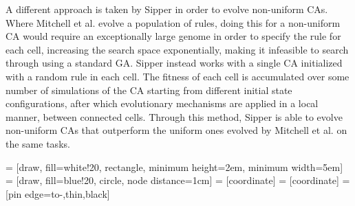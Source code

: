 A different approach is taken by Sipper \cite{Sipper2004} in order to evolve
non-uniform CAs. Where Mitchell et al. evolve a population of rules, doing this
for a non-uniform CA would require an exceptionally large genome in order to
specify the rule for each cell, increasing the search space exponentially,
making it infeasible to search through using a standard GA. Sipper instead
works with a single CA initialized with a random rule in each cell. The fitness
of each cell is accumulated over some number of simulations of the CA starting
from different initial state configurations, after which evolutionary mechanisms
are applied in a local manner, between connected cells. Through this method,
Sipper is able to evolve non-uniform CAs that outperform the uniform ones
evolved by Mitchell et al. on the same tasks.


 = [draw, fill=white!20, rectangle, 
    minimum height=2em, minimum width=5em]
 = [draw, fill=blue!20, circle, node distance=1cm]
 = [coordinate]
 = [coordinate]
 = [pin edge={to-,thin,black}]
